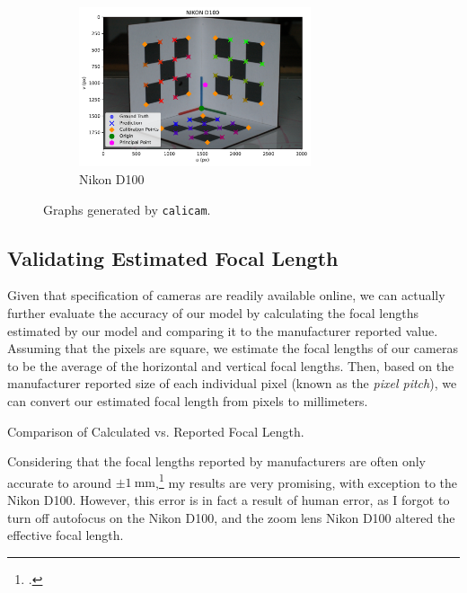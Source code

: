 \begin{figure}[H]
    \ContinuedFloat
    \centering
    \begin{subfigure}{\textwidth}
        \centering
        \includegraphics[width=0.75\textwidth]{assets/results/NIKON D100/graph.pdf}
        \caption{Nikon D100}
    \end{subfigure}
    \caption{Graphs generated by \texttt{calicam}.}
\end{figure}

\subsection{Validating Estimated Focal Length}
Given that specification of cameras are readily available online, we can actually further evaluate the accuracy of our model by calculating the focal lengths estimated by our model and comparing it to the manufacturer reported value. Assuming that the pixels are square, we estimate the focal lengths of our cameras to be the average of the horizontal and vertical focal lengths. Then, based on the manufacturer reported size of each individual pixel (known as the \emph{pixel pitch}), we can convert our estimated focal length from pixels to millimeters.

\begin{table}[H]
    \centering
    
    \caption{Comparison of Calculated vs. Reported Focal Length.}
\end{table}

Considering that the focal lengths reported by manufacturers are often only accurate to around $\pm \qty{1}{\milli\meter}$,\footcite{waynefAnswerAre2017} my results are very promising, with exception to the Nikon D100. However, this error is in fact a result of human error, as I forgot to turn off autofocus on the Nikon D100, and the zoom lens Nikon D100 altered the effective focal length.



